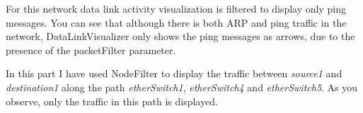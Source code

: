 \documentclass[a4paper]{article}
\begin{document}
	For this network data link activity visualization is filtered to display only ping messages.
	You can see that although there is both ARP and ping traffic in the network, DataLinkVisualizer only shows the ping messages as arrows, due to the presence of the packetFilter parameter.
	
	In this part I have used NodeFilter to display the traffic between \textit{source1} and \textit{destination1} along the path \textit{etherSwitch1}, \textit{etherSwitch4} and \textit{etherSwitch5}. As you observe, only the traffic in this path is displayed.
	
\end{document}
